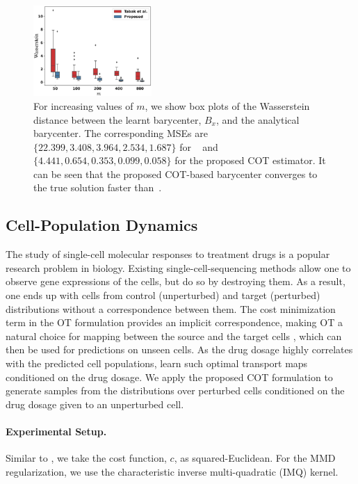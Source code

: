 \begin{figure}[t]
    \centering
    \includegraphics[width=0.4\textwidth]{chapter-3/images/final-bary-wass.pdf}
    \caption[Evaluation of the barycenters obtained with the proposed COT formulation in terms of convergence to the analytical barycenter, on increasing the number of samples.]{For increasing values of $m$, we show box plots of the Wasserstein distance between the learnt barycenter, $B_x$, and the analytical barycenter. The corresponding MSEs are $\{22.399,  3.408, 3.964, 2.534, 1.687\}$ for ~\cite{Tabak21} and $\{4.441, 0.654, 0.353, 0.099, 0.058\}$ for the proposed COT estimator. It can be seen that the proposed COT-based barycenter converges to the true solution faster than~\cite{Tabak21}.}
    \label{fig:my_label10}
\end{figure}
\subsection{Cell-Population Dynamics}\label{sec:simbio}
The study of single-cell molecular responses to treatment drugs is a popular research problem in biology. Existing single-cell-sequencing methods allow one to observe gene expressions of the cells, but do so by destroying them. As a result, one ends up with cells from control (unperturbed) and target (perturbed) distributions without a correspondence between them. The cost minimization term in the OT formulation provides an implicit correspondence, making OT a natural choice for mapping between the source and the target cells \citep{cellot}, which can then be used for predictions on unseen cells. As the drug dosage highly correlates with the predicted cell populations, \cite{Cuturi22} learn such optimal transport maps conditioned on the drug dosage. We apply the proposed COT formulation to generate samples from the distributions over perturbed cells conditioned on the drug dosage given to an unperturbed cell.


\paragraph{Experimental Setup.} Similar to \cite{Cuturi22}, we take the cost function, $c$, as squared-Euclidean. For the MMD regularization, we use the characteristic inverse multi-quadratic (IMQ) kernel.

